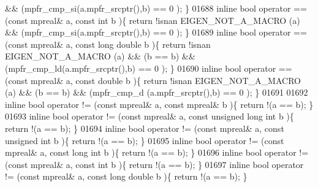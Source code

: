 \begin{DoxyCode}
       && (mpfr\_cmp\_si(a.mpfr\_srcptr(),b) == 0 );                \}
01688 \textcolor{keyword}{inline} \textcolor{keywordtype}{bool} operator == (\textcolor{keyword}{const} mpreal& a, \textcolor{keyword}{const} \textcolor{keywordtype}{int} b               )\{  \textcolor{keywordflow}{return} !isnan EIGEN\_NOT\_A\_MACRO (a)
       && (mpfr\_cmp\_si(a.mpfr\_srcptr(),b) == 0 );                \}
01689 \textcolor{keyword}{inline} \textcolor{keywordtype}{bool} operator == (\textcolor{keyword}{const} mpreal& a, \textcolor{keyword}{const} \textcolor{keywordtype}{long} \textcolor{keywordtype}{double} b       )\{  \textcolor{keywordflow}{return} !isnan EIGEN\_NOT\_A\_MACRO (a)
       && (b == b) && (mpfr\_cmp\_ld(a.mpfr\_srcptr(),b) == 0 );   \}
01690 \textcolor{keyword}{inline} \textcolor{keywordtype}{bool} operator == (\textcolor{keyword}{const} mpreal& a, \textcolor{keyword}{const} \textcolor{keywordtype}{double} b            )\{  \textcolor{keywordflow}{return} !isnan EIGEN\_NOT\_A\_MACRO (a)
       && (b == b) && (mpfr\_cmp\_d (a.mpfr\_srcptr(),b) == 0 );   \}
01691 
01692 \textcolor{keyword}{inline} \textcolor{keywordtype}{bool} operator != (\textcolor{keyword}{const} mpreal& a, \textcolor{keyword}{const} mpreal& b           )\{  \textcolor{keywordflow}{return} !(a == b);  \}
01693 \textcolor{keyword}{inline} \textcolor{keywordtype}{bool} operator != (\textcolor{keyword}{const} mpreal& a, \textcolor{keyword}{const} \textcolor{keywordtype}{unsigned} \textcolor{keywordtype}{long} \textcolor{keywordtype}{int} b )\{  \textcolor{keywordflow}{return} !(a == b);  \}
01694 \textcolor{keyword}{inline} \textcolor{keywordtype}{bool} operator != (\textcolor{keyword}{const} mpreal& a, \textcolor{keyword}{const} \textcolor{keywordtype}{unsigned} \textcolor{keywordtype}{int} b      )\{  \textcolor{keywordflow}{return} !(a == b);  \}
01695 \textcolor{keyword}{inline} \textcolor{keywordtype}{bool} operator != (\textcolor{keyword}{const} mpreal& a, \textcolor{keyword}{const} \textcolor{keywordtype}{long} \textcolor{keywordtype}{int} b          )\{  \textcolor{keywordflow}{return} !(a == b);  \}
01696 \textcolor{keyword}{inline} \textcolor{keywordtype}{bool} operator != (\textcolor{keyword}{const} mpreal& a, \textcolor{keyword}{const} \textcolor{keywordtype}{int} b               )\{  \textcolor{keywordflow}{return} !(a == b);  \}
01697 \textcolor{keyword}{inline} \textcolor{keywordtype}{bool} operator != (\textcolor{keyword}{const} mpreal& a, \textcolor{keyword}{const} \textcolor{keywordtype}{long} \textcolor{keywordtype}{double} b       )\{  \textcolor{keywordflow}{return} !(a == b);  \}

\end{DoxyCode}
